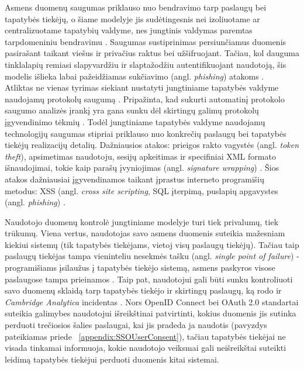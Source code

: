 Asmens duomenų saugumas priklauso nuo
bendravimo tarp paslaugų bei tapatybės tiekėjų, o šiame modelyje jis sudėtingesnis nei izoliuotame ar centralizuotame
tapatybių valdyme, nes jungtinis valdymas paremtas tarpdomeniniu bendravimu \cite{Maler2008}. Saugumas sustiprinimas persiunčiamus
duomenis pasirašant taikant viešus ir privačius raktus bei užšifruojant. Tačiau, kol dauguma tinklalapių remiasi slapyvardžiu ir slaptažodžiu autentifikuojant naudotoją,
šis modelis išlieka labai pažeidžiamas sukčiavimo (angl. \textit{phishing}) atakoms \cite{Maler2008}.\\
Atliktas ne vienas tyrimas siekiant nustatyti jungtiniame tapatybės valdyme naudojamų protokolų saugumą \cite{SAMLSecurity, OAuthSecurity, OIDCSecurity}. Pripažinta, kad
sukurti automatinį protokolo saugumo analizės įrankį yra gana sunku dėl skirtingų galimų protokolų įgyvendinimo tėkmių \cite{OIDCSecurity}. Todėl jungtiniame tapatybės valdyme
naudojamų technologijų saugumas stipriai priklauso nuo konkrečių paslaugų bei tapatybės tiekėjų realizacijų detalių. Dažniausios atakos: prieigos rakto vagystės (angl. \textit{token theft}),
 apsimetimas naudotoju, sesijų apkeitimas ir specifiniai XML formato išnaudojimai, tokie kaip parašų įvyniojimas (angl. \textit{signature wrapping}) \cite{SAMLSecurity, OAuthSecurity, OIDCSecurity}.
 Šios atakos dažniausiai įgyvendinamos taikant įprastus interneto programišių metodus: XSS (angl. \textit{cross site scripting}, SQL įterpimą, puslapių apgavystes (angl. \textit{phishing}) \cite{OIDCSecurity}.

Naudotojo duomenų kontrolė jungtiniame 
modelyje turi tiek privalumų, tiek trūkumų. Viena vertus, naudotojas savo asmens duomenis suteikia mažesniam kiekiui sistemų (tik tapatybės tiekėjams,
vietoj visų paslaugų tiekėjų). Tačiau taip paslaugų tiekėjas tampa vieninteliu nesekmės tašku (angl. \textit{single point of failure}) - programišiams įsilaužus
į tapatybės tiekėjo sistemą, asmens paskyros visose paslaugose tampa prieinamos \cite{Pashalidis2003}. Taip pat, naudotojui gali būti sunku kontroliuoti
savo duomenų sklaidą tarp tapatybės tiekėjo ir skirtingų paslaugų, ką rodo ir \textit{Cambridge Analytica} incidentas \cite{CambridgeAnalytica}. Nors OpenID Connect bei OAuth 2.0
standartai suteikia galimybes naudotojui išreikštinai patvirtinti, kokius duomenis jis sutinka perduoti trečiosios šalies paslaugai, kai
jis pradeda ja naudotis (pavyzdys pateikiamas priede ~\ref{appendix:SSOUserConsent}), tačiau tapatybės tiekėjai ne visada tinkamai informuoja,
kokie naudotojo veiksmai gali neišreikštai suteikti leidimą tapatybės tiekėjui perduoti duomenis kitai sistemai.


